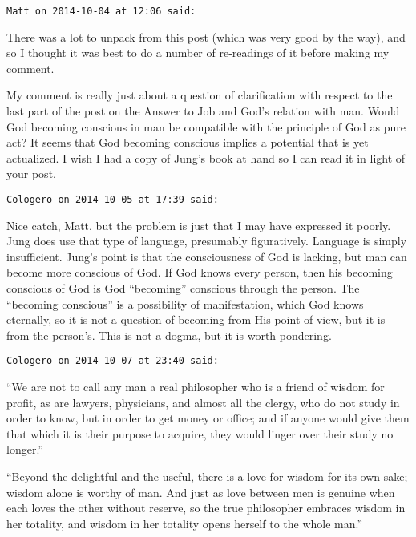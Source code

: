 \begin{footnotesize}\begin{sffamily}

\texttt{Matt on 2014-10-04 at 12:06 said: }

There was a lot to unpack from this post (which was very good by the way), and so I thought it was best to do a number of re-readings of it before making my comment.

My comment is really just about a question of clarification with respect to the last part of the post on the Answer to Job and God's relation with man. Would God becoming conscious in man be compatible with the principle of God as pure act? It seems that God becoming conscious implies a potential that is yet actualized. I wish I had a copy of Jung's book at hand so I can read it in light of your post.

\hfill

\texttt{Cologero on 2014-10-05 at 17:39 said: }

Nice catch, Matt, but the problem is just that I may have expressed it poorly. Jung does use that type of language, presumably figuratively. Language is simply insufficient. Jung's point is that the consciousness of God is lacking, but man can become more conscious of God. If God knows every person, then his becoming conscious of God is God “becoming” conscious through the person. The “becoming conscious” is a possibility of manifestation, which God knows eternally, so it is not a question of becoming from His point of view, but it is from the person's. This is not a dogma, but it is worth pondering.

\hfill

\texttt{Cologero on 2014-10-07 at 23:40 said: }

“We are not to call any man a real philosopher who is a friend of wisdom for profit, as are lawyers, physicians, and almost all the clergy, who do not study in order to know, but in order to get money or office; and if anyone would give them that which it is their purpose to acquire, they would linger over their study no longer.”

“Beyond the delightful and the useful, there is a love for wisdom for its own sake; wisdom alone is worthy of man. And just as love between men is genuine when each loves the other without reserve, so the true philosopher embraces wisdom in her totality, and wisdom in her totality opens herself to the whole man.”


\hfill

\end{sffamily}\end{footnotesize}
